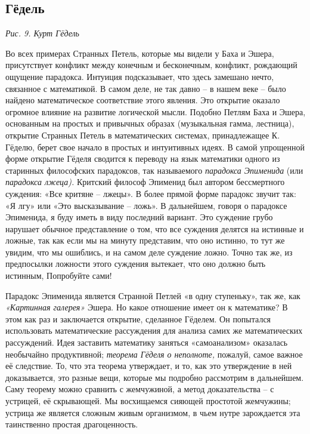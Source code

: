 \documentclass[../main.tex]{subfiles}
\begin{document}
\subsection{Гёдель}

\emph{Рис. 9. Курт Гёдель}

Во всех примерах Странных Петель, которые мы видели у Баха и Эшера, присутствует конфликт между конечным и бесконечным, конфликт, рождающий ощущение парадокса. Интуиция подсказывает, что здесь замешано нечто, связанное с математикой. В самом деле, не так давно \--- в нашем веке \--- было найдено математическое соответствие этого явления. Это открытие оказало огромное влияние на развитие логической мысли. Подобно Петлям Баха и Эшера, основанным на простых и привычных образах (музыкальная гамма, лестница), открытие Странных Петель в математических системах, принадлежащее К. Гёделю, берет свое начало в простых и интуитивных идеях. В самой упрощенной форме открытие Гёделя сводится к переводу на язык математики одного из старинных философских парадоксов, так называемого \emph{парадокса Эпименида} (или \emph{парадокса лжеца).} Критский философ Эпименид был автором бессмертного суждения: «Все критяне \--- лжецы». В более прямой форме парадокс звучит так: «Я лгу» или «Это высказывание \--- ложь». В дальнейшем, говоря о парадоксе Эпименида, я буду иметь в виду последний вариант. Это суждение грубо нарушает обычное представление о том, что все суждения делятся на истинные и ложные, так как если мы на минуту представим, что оно истинно, то тут же увидим, что мы ошиблись, и на самом деле суждение ложно. Точно так же, из предпосылки ложности этого суждения вытекает, что оно должно быть истинным, Попробуйте сами!

Парадокс Эпименида является Странной Петлей «в одну ступеньку», так же, как \emph{«Картинная галерея»} Эшера. Но какое отношение имеет он к математике? В этом как раз и заключается открытие, сделанное Гёделем. Он попытался использовать математические рассуждения для анализа самих же математических рассуждений. Идея заставить математику заняться «самоанализом» оказалась необычайно продуктивной; \emph{теорема Гёделя о неполноте,} пожалуй, самое важное её следствие. То, что эта теорема утверждает, и то, как это утверждение в ней доказывается, это разные вещи, которые мы подробно рассмотрим в дальнейшем. Саму теорему можно сравнить с жемчужиной, а метод доказательства \--- с устрицей, её скрывающей. Мы восхищаемся сияющей простотой жемчужины; устрица же является сложным живым организмом, в чьем нутре зарождается эта таинственно простая драгоценность.
\end{document}
